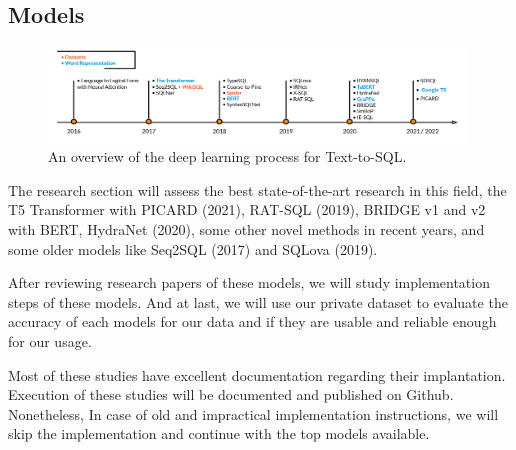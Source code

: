 \subsection*{Models}

\begin{figure}[htb]
    \centering
    \includegraphics[width=0.99\textwidth]{pics/Timeline.png}
    \caption{An overview of the deep learning process for Text-to-SQL.}
    \label{fig:timeline}
\end{figure}

The research section will assess the best state-of-the-art research in this field, the T5\cite{raffel_exploring_2020} Transformer with PICARD\cite{scholak_picard_2021} (2021), RAT-SQL\cite{wang_rat-sql_2021} (2019), BRIDGE v1 and v2\cite{lin_bridging_2020} with BERT, HydraNet\cite{lyu_hybrid_2020} (2020), some other novel methods in recent years, and some older models like Seq2SQL\cite{zhong_seq2sql_2017} (2017) and SQLova\cite{hwang_comprehensive_2019} (2019).


After reviewing research papers of these models, we will study implementation steps of these models. And at last, we will use our private dataset to evaluate the accuracy of each models for our data and if they are usable and reliable enough for our usage.

Most of these studies have excellent documentation regarding their implantation. Execution of these studies will be documented and published on Github. Nonetheless, In case of old and impractical implementation instructions, we will skip the implementation and continue with the top models available.











